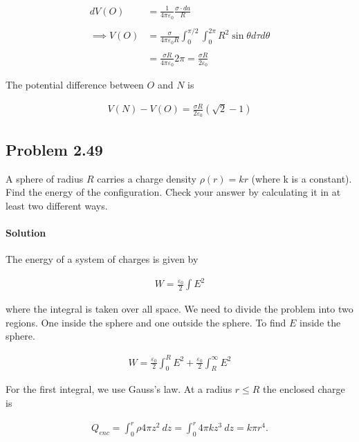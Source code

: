 \documentclass{article}
\begin{document}
\begin{align*}
    dV(O) &= \frac{1}{4\pi\varepsilon_0}\frac{\sigma \cdot da}{R}\\
    \\
    \implies V(O) &= \frac{\sigma}{4\pi\varepsilon_0R}\int_0^{\pi/2}\int_0^{2\pi}R^2\sin\theta d\tau d\theta\\ \\
    & = \frac{\sigma R}{4\pi \varepsilon_0}2\pi = \frac{\sigma R}{2\varepsilon_0}
\end{align*}

The potential difference between $O$ and $N$ is 

\begin{align*}
    V(N) - V(O) = \frac{\sigma R}{2\varepsilon_0}(\sqrt{2} - 1)
\end{align*}

\newpage

\subsection*{Problem 2.49} A sphere of radius $R$ carries a charge density $\rho(r) = kr$ (where k is a constant). Find the energy of the configuration. Check your answer by calculating it in at least two different ways.

\paragraph{Solution} The energy of a system of charges is given by 

\begin{align*}
    W = \frac{\varepsilon_0}{2}\int E^2
\end{align*}

where the integral is taken over all space. We need to divide the problem into two regions. One inside the sphere and one outside the sphere. To find $E$ inside the sphere.

\begin{align*}
    W = \frac{\varepsilon_0}{2}\int_0^R E^2 + \frac{\varepsilon_0}{2}\int_R^{\infty} E^2
\end{align*}

For the first integral, we use Gauss's law. At a radius $r \leq R$ the enclosed charge is 

\begin{align*}
    Q_{enc} = \int_0^r \rho 4\pi z^2\ dz = \int_0^r 4\pi k z^3\ dz = k\pi r^4.
\end{align*}
\end{document}
